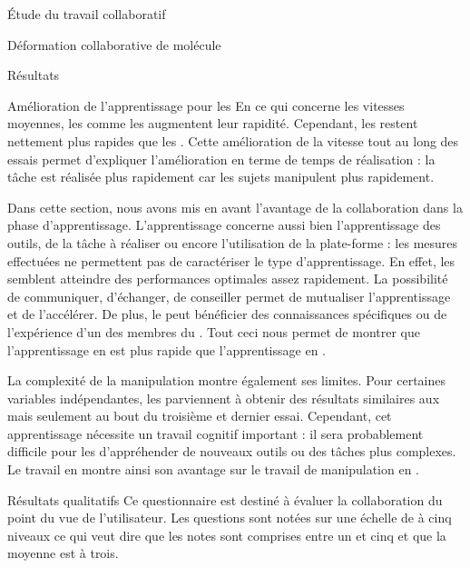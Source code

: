 \documentclass[myfrancais]{mythesis}
\begin{document}
\begin{mypart}{Étude du travail collaboratif}
\begin{mychapter}{Déformation collaborative de molécule}
\begin{mysection}{Résultats}
\begin{mysubsection}{Amélioration de l'apprentissage pour les }
					En ce qui concerne les vitesses moyennes, les  comme les  augmentent leur rapidité.
					Cependant, les  restent nettement plus rapides que les .
					Cette amélioration de la vitesse tout au long des essais permet d'expliquer l'amélioration en terme de temps de réalisation : la tâche est réalisée plus rapidement car les sujets manipulent plus rapidement.

					Dans cette section, nous avons mis en avant l'avantage de la collaboration dans la phase d'apprentissage.
					L'apprentissage concerne aussi bien l'apprentissage des outils, de la tâche à réaliser ou encore l'utilisation de la plate-forme : les mesures effectuées ne permettent pas de caractériser le type d'apprentissage.
					En effet, les  semblent atteindre des performances optimales assez rapidement.
					La possibilité de communiquer, d'échanger, de conseiller permet de mutualiser l'apprentissage et de l'accélérer.
					De plus, le  peut bénéficier des connaissances spécifiques ou de l'expérience d'un des membres du .
					Tout ceci nous permet de montrer que l'apprentissage en  est plus rapide que l'apprentissage en .

					La complexité de la manipulation  montre également ses limites.
					Pour certaines variables indépendantes, les  parviennent à obtenir des résultats similaires aux  mais seulement au bout du troisième et dernier essai.
					Cependant, cet apprentissage nécessite un travail cognitif important : il sera probablement difficile pour les  d'appréhender de nouveaux outils ou des tâches plus complexes.
					Le travail en  montre ainsi son avantage sur le travail de manipulation  en .
				\end{mysubsection}
				\begin{mysubsection}{Résultats qualitatifs}
					Ce questionnaire est destiné à évaluer la collaboration du point du vue de l'utilisateur.
					Les questions sont notées sur une échelle de  à cinq niveaux ce qui veut dire que les notes sont comprises entre un et cinq et que la moyenne est à trois.


\end{mysubsection}
\end{mysection}
\end{mychapter}
\end{mypart}
\end{document}
